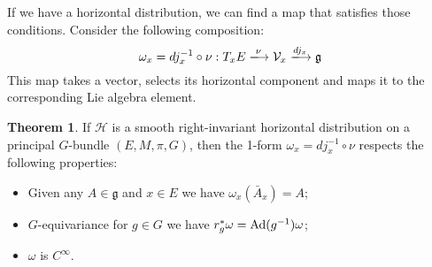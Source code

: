 \documentclass[12pt,a4paper]{report}
\theoremstyle{definition}
\theoremstyle{Theorem}
\newtheorem{Theo}[Def]{Theorem}
\theoremstyle{definition}
\theoremstyle{definition}
\begin{document}
	If we have a horizontal distribution, we can find a map that satisfies those conditions. Consider the following composition:
	$$\omega_{x}=dj_{x}^{-1}\circ \nu:T_{x}E\xlongrightarrow{\nu} \mathcal{V}_{x}\xlongrightarrow{dj_{x}}\mathfrak{g}$$
	This map takes a vector, selects its horizontal component and maps it to the corresponding Lie algebra element.
	\begin{Theo}
		If $\mathcal{H}$ is a smooth right-invariant horizontal distribution on a principal $G$-bundle $(E,M,\pi,G)$, then the 1-form $\omega_{x}=dj_{x}^{-1}\circ \nu$ respects the following properties:
		\begin{itemize}
			\item Given any $A\in\mathfrak{g}$ and $x\in E$ we have $\omega_{x}(\bar{A}_{x})=A$;
			\item $G$-equivariance for $g\in G$ we have $r^*_g\omega=\hbox{Ad}(g^{-1})\omega$;
			\item $\omega$ is $C^\infty$.
		\end{itemize}
	\end{Theo}
\end{document}
